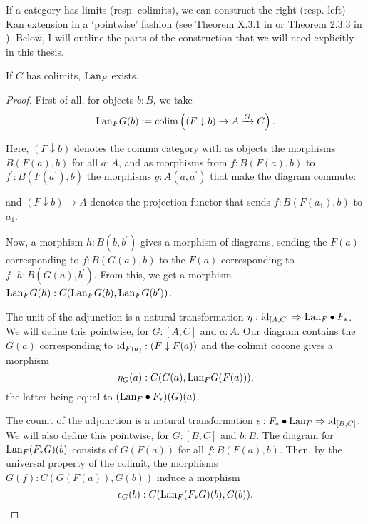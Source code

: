If a category has limits (resp. colimits), we can construct the right (resp. left) Kan extension in a `pointwise' fashion (see Theorem X.3.1 in \cite{MacLane} or Theorem 2.3.3 in \cite{Kashiwara}). Below, I will outline the parts of the construction that we will need explicitly in this thesis.
\begin{lemma}
  If $ C $ has colimits, $ \text{Lan}_{F} $ exists.
\end{lemma}
\begin{proof}
  First of all, for objects $ b: B $, we take
  \[ \text{Lan}_{F}G(b) := \text{colim} \left( (F \downarrow b) \to A \xrightarrow G C \right). \]

  Here, $ (F \downarrow b) $ denotes the comma category with as objects the morphisms $ B(F(a), b) $ for all $ a: A $, and as morphisms from $ f: B(F(a), b) $ to $ f^\prime: B(F(a^\prime), b) $ the morphisms $ g: A(a, a^\prime) $ that make the diagram commute:
  \begin{center}
  \end{center}
  and $ (F \downarrow b) \to A $ denotes the projection functor that sends $ f: B(F(a_1), b) $ to $ a_1 $.

  Now, a morphism $ h: B(b, b^\prime) $ gives a morphism of diagrams, sending the $ F(a) $ corresponding to $ f: B(G(a), b) $ to the $ F(a) $ corresponding to $ f \cdot h: B(G(a), b^\prime) $. From this, we get a morphism $ \text{Lan}_{F}G(h): C(\text{Lan}_{F}G(b), \text{Lan}_{F}G(b^\prime)) $.

  The unit of the adjunction is a natural transformation $ \eta: \text{id}_{[A, C]} \Rightarrow \text{Lan}_{F} \bullet F_* $. We will define this pointwise, for $ G: [A, C] $ and $ a: A $. Our diagram contains the $ G(a) $ corresponding to $ \text{id}_{F(a)}: (F \downarrow F(a)) $ and the colimit cocone gives a morphism
  \[ \eta_G(a) : C(G(a), \text{Lan}_{F}G (F(a))), \]
  the latter being equal to $ (\text{Lan}_{F} \bullet F_*)(G)(a) $.

  The counit of the adjunction is a natural transformation $ \epsilon: F_* \bullet \text{Lan}_{F} \Rightarrow \text{id}_{[B, C]} $. We will also define this pointwise, for $ G: [B, C] $ and $ b: B $. The diagram for $ \text{Lan}_{F}(F_* G)(b) $ consists of $ G(F(a)) $ for all $ f: B(F(a), b) $. Then, by the universal property of the colimit, the morphisms $ G(f): C(G(F(a)), G(b)) $ induce a morphism
  \[ \epsilon_G(b) : C(\text{Lan}_{F}(F_* G)(b), G(b)). \]
\end{proof}

